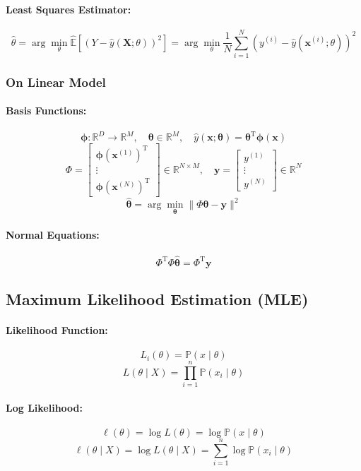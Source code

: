 \documentclass{article}
\begin{document}
\paragraph{Least Squares Estimator:}
\[
    \hat{\theta} = \arg\min_{\theta} \hat{\mathbb{E}}[(Y-\hat{y}(\mathbf{X}; \theta))^2] = \arg\min_{\theta} \frac{1}{N} \sum_{i=1}^N \left(y^{(i)} - \hat{y}(\mathbf{x}^{(i)}; \theta)\right)^2
\]

\subsubsection{On Linear Model}
\paragraph{Basis Functions:}
\[
    \boldsymbol{\phi}: \mathbb{R}^D \to \mathbb{R}^M, \quad \boldsymbol{\theta} \in \mathbb{R}^M, \quad \hat{y}(\mathbf{x}; \boldsymbol{\theta}) = \boldsymbol{\theta}^{\mathrm{T}} \boldsymbol{\phi}(\mathbf{x})
\]
\[
    \Phi = \begin{bmatrix} \boldsymbol{\phi}(\mathbf{x}^{(1)})^{\mathrm{T}} \\ \vdots \\ \boldsymbol{\phi}(\mathbf{x}^{(N)})^{\mathrm{T}} \end{bmatrix} \in \mathbb{R}^{N \times M}, \quad \mathbf{y} = \begin{bmatrix} y^{(1)} \\ \vdots \\ y^{(N)} \end{bmatrix} \in \mathbb{R}^N
\]
\[
    \hat{\boldsymbol{\theta}} = \arg\min_{\boldsymbol{\theta}} \|\Phi \boldsymbol{\theta} - \mathbf{y}\|^2
\]
\paragraph{Normal Equations:}
\[
    \Phi^{\mathrm{T}} \Phi \hat{\boldsymbol{\theta}} = \Phi^{\mathrm{T}} \mathbf{y}
\]

\subsection{Maximum Likelihood Estimation (MLE)}
\paragraph{Likelihood Function:}
\[
    L_i(\theta) = \mathbb{P}(x \mid \theta)
\]
\[
    L(\theta \mid X) = \prod_{i=1}^{n} \mathbb{P}(x_i \mid \theta)
\]
\paragraph{Log Likelihood:}
\[
    \ell(\theta) = \log L(\theta) = \log \mathbb{P}(x \mid \theta)
\]
\[
    \ell(\theta \mid X) = \log L(\theta \mid X) = \sum_{i=1}^{n} \log \mathbb{P}(x_i \mid \theta)
\]
\end{document}
